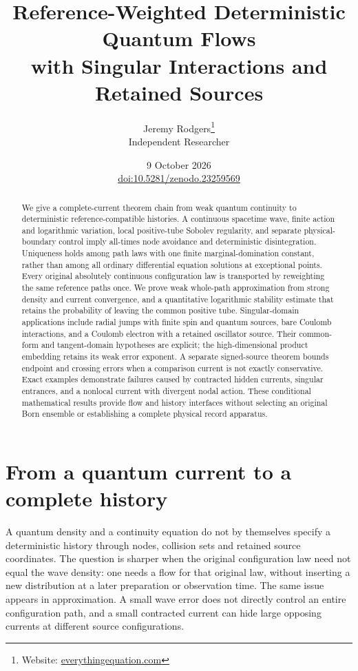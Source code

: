 \documentclass[11pt]{article}
\title{Reference-Weighted Deterministic Quantum Flows\protect\\with Singular Interactions and Retained Sources}
\author{Jeremy Rodgers\thanks{Website: \href{https://everythingequation.com}{everythingequation.com}}\\Independent Researcher}
\date{9 October 2026\\[0.4em]\small
\href{https://doi.org/10.5281/zenodo.23259569}{doi:10.5281/zenodo.23259569}}
\numberwithin{equation}{section}
\theoremstyle{definition}
\theoremstyle{remark}
\begin{document}
\maketitle
\begin{abstract}
We give a complete-current theorem chain from weak quantum continuity to deterministic reference-compatible histories. A continuous spacetime wave, finite action and logarithmic variation, local positive-tube Sobolev regularity, and separate physical-boundary control imply all-times node avoidance and deterministic disintegration. Uniqueness holds among path laws with one finite marginal-domination constant, rather than among all ordinary differential equation solutions at exceptional points. Every original absolutely continuous configuration law is transported by reweighting the same reference paths once. We prove weak whole-path approximation from strong density and current convergence, and a quantitative logarithmic stability estimate that retains the probability of leaving the common positive tube. Singular-domain applications include radial jumps with finite spin and quantum sources, bare Coulomb interactions, and a Coulomb electron with a retained oscillator source. Their common-form and tangent-domain hypotheses are explicit; the high-dimensional product embedding retains its weak error exponent. A separate signed-source theorem bounds endpoint and crossing errors when a comparison current is not exactly conservative. Exact examples demonstrate failures caused by contracted hidden currents, singular entrances, and a nonlocal current with divergent nodal action. These conditional mathematical results provide flow and history interfaces without selecting an original Born ensemble or establishing a complete physical record apparatus.
\end{abstract}
\clearpage
\tableofcontents
\newpage
\section{From a quantum current to a complete history}\label{p3r:introduction}
A quantum density and a continuity equation do not by themselves specify a deterministic history through nodes, collision sets and retained source coordinates. The question is sharper when the original configuration law need not equal the wave density: one needs a flow for that original law, without inserting a new distribution at a later preparation or observation time. The same issue appears in approximation. A small wave error does not directly control an entire configuration path, and a small contracted current can hide large opposing currents at different source configurations.
\end{document}

